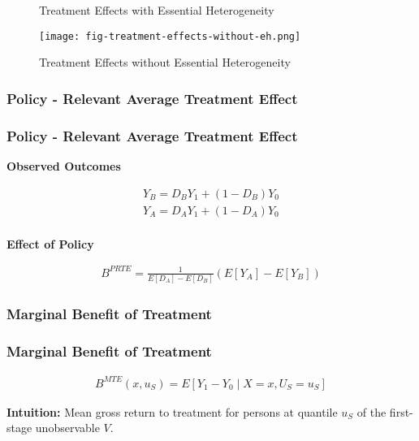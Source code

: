 \begin{frame}

\begin{figure}[htp]\centering
	\caption{Treatment Effects with Essential Heterogeneity}\label{Treatment Effects Conventional}
\end{figure}

\end{frame}


\begin{frame}

\begin{figure}[htp]\centering
	\caption{Treatment Effects without Essential Heterogeneity}\label{Treatment Effects Without Essential Heterogeneity}\scalebox{0.35}
	{\texttt{[image: fig-treatment-effects-without-eh.png]}}
\end{figure}

\end{frame}


\begin{frame}
    \subsubsection{Policy - Relevant Average Treatment Effect}\label{policy---relevant-average-treatment-effect}
\frametitle{Policy - Relevant Average Treatment Effect}

\textbf{Observed Outcomes}

\begin{align*}
Y_B = D_B Y_1 + (1 - D_B) Y_0 \\
Y_A = D_A Y_1 + (1 - D_A) Y_0 \\
\end{align*}

\textbf{Effect of Policy}

\begin{align*}
B^{PRTE} = \frac{1}{E[D_A] - E[D_B]} (E[Y_A] - E[Y_B])
\end{align*}

\end{frame}


\begin{frame}
    \subsubsection{Marginal Benefit of Treatment}\label{marginal-benefit-of-treatment}
\frametitle{Marginal Benefit of Treatment}

\begin{align*}
B^{MTE}(x, u_S) = E [Y_1 - Y_0 \mid X = x, U_S = u_S]
\end{align*}

\textbf{Intuition:} Mean gross return to treatment for persons at
quantile \(u_S\) of the first-stage unobservable \(V\).

\end{frame}


